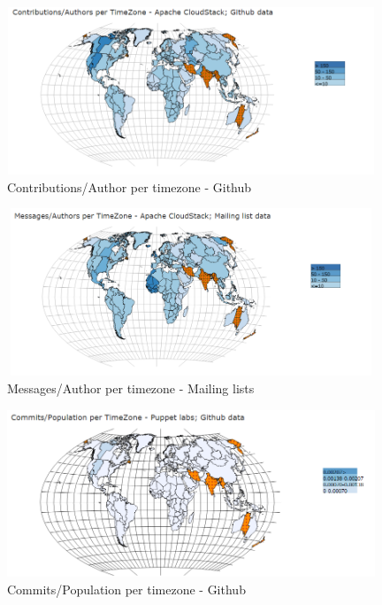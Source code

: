 \documentclass[seploa]{beavtex}
\begin{document}
\begin{figure}[H]
\centering
\includegraphics[width=110mm,height=50mm]{image8.PNG}
\caption{Contributions/Author per timezone - Github}
\label{fig:div1}
\end{figure}

\begin{figure}[H]
\centering
\includegraphics[width=110mm,height=50mm]{image9.PNG}
\caption{Messages/Author per timezone - Mailing lists}
\label{fig:div2}
\end{figure}

\begin{figure}[H]
\centering
\includegraphics[width=110mm,height=50mm]{image10.PNG}
\caption{Commits/Population per timezone - Github}
\label{fig:div3}
\end{figure}
\end{document}
